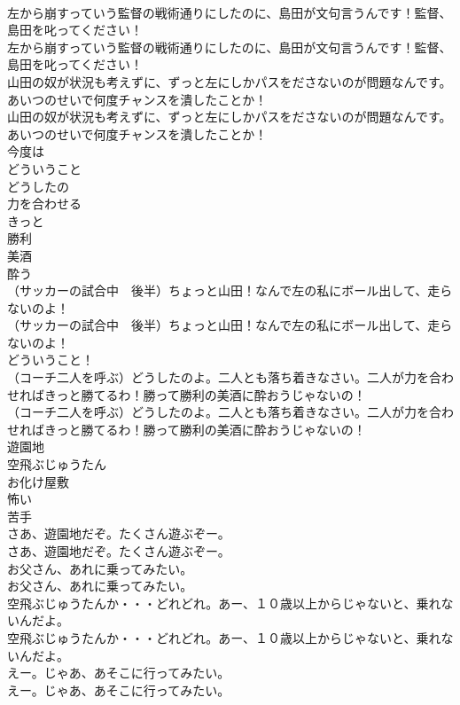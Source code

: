 \documentclass[8pt]{extreport}
\begin{document}
\begin{CJK}{UTF8}{min}
\\	左から崩すっていう監督の戦術通りにしたのに、島田が文句言うんです！監督、島田を叱ってください！	
\\	左から崩すっていう監督の戦術通りにしたのに、島田が文句言うんです！監督、島田を叱ってください！ 
\\	山田の奴が状況も考えずに、ずっと左にしかパスをださないのが問題なんです。あいつのせいで何度チャンスを潰したことか！	
\\	山田の奴が状況も考えずに、ずっと左にしかパスをださないのが問題なんです。あいつのせいで何度チャンスを潰したことか！ 
\\	今度は
\\	どういうこと
\\	どうしたの
\\	力を合わせる
\\	きっと
\\	勝利
\\	美酒
\\	酔う
\\	（サッカーの試合中　後半）ちょっと山田！なんで左の私にボール出して、走らないのよ！	
\\	（サッカーの試合中　後半）ちょっと山田！なんで左の私にボール出して、走らないのよ！ 
\\	どういうこと！	
\\	（コーチ二人を呼ぶ）どうしたのよ。二人とも落ち着きなさい。二人が力を合わせればきっと勝てるわ！勝って勝利の美酒に酔おうじゃないの！	
\\	（コーチ二人を呼ぶ）どうしたのよ。二人とも落ち着きなさい。二人が力を合わせればきっと勝てるわ！勝って勝利の美酒に酔おうじゃないの！ 
\\	遊園地
\\	空飛ぶじゅうたん
\\	お化け屋敷
\\	怖い
\\	苦手
\\	さあ、遊園地だぞ。たくさん遊ぶぞー。	
\\	さあ、遊園地だぞ。たくさん遊ぶぞー。 
\\	お父さん、あれに乗ってみたい。	
\\	お父さん、あれに乗ってみたい。 
\\	空飛ぶじゅうたんか・・・どれどれ。あー、１０歳以上からじゃないと、乗れないんだよ。	
\\	空飛ぶじゅうたんか・・・どれどれ。あー、１０歳以上からじゃないと、乗れないんだよ。 
\\	えー。じゃあ、あそこに行ってみたい。	
\\	えー。じゃあ、あそこに行ってみたい。 

\end{CJK}
\end{document}
